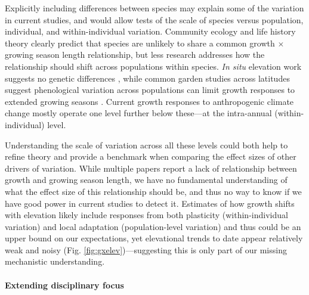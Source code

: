 \documentclass[11pt]{article}
\begin{document}
Explicitly including differences between species may explain some of the variation in current studies, and would allow tests of the scale of species versus population, individual, and within-individual variation. Community ecology and life history theory clearly predict that species are unlikely to share a common growth $\times$ growing season length relationship, but less research addresses how the relationship should shift across populations within species. \emph{In situ} elevation work suggests no genetic differences \citep{king2013tree}, while common garden studies across latitudes suggest phenological variation across populations can limit growth responses to extended growing seasons \citep{soolanayakanahally2013timing}. Current growth responses to anthropogenic climate change mostly operate one level further below these---at the intra-annual (within-individual) level. 


Understanding the scale of variation across all these levels could both help to refine theory and provide a benchmark when comparing the effect sizes of other drivers of variation. While multiple papers report a lack of relationship between growth and growing season length, we have no fundamental understanding of what the effect size of this relationship should be, and thus no way to know if we have good power in current studies to detect it. Estimates of how growth shifts with elevation likely include responses from both plasticity (within-individual variation) and local adaptation (population-level variation) and thus could be an upper bound on our expectations, yet elevational trends to date appear relatively weak and noisy (Fig. \ref{fig:gxelev})---suggesting this is only part of our missing mechanistic understanding. 

\paragraph{Extending disciplinary focus} 
\end{document}
